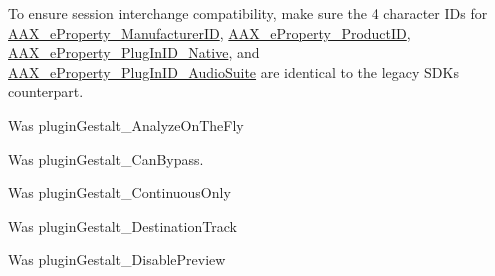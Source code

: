 \begin{DoxyRefList}
\label{a00880__porting_notes000040}%
%
 To ensure session interchange compatibility, make sure the 4 character IDs for \mbox{\hyperlink{a00737_a13e384f22825afd3db6d68395b79ce0da996465cca29a2a15291d1c788ac5728c}{AAX\+\_\+e\+Property\+\_\+\+Manufacturer\+ID}}, \mbox{\hyperlink{a00737_a13e384f22825afd3db6d68395b79ce0da3a41fcdff5af1a4fd19dcbca7b1ba6f3}{AAX\+\_\+e\+Property\+\_\+\+Product\+ID}}, \mbox{\hyperlink{a00737_a13e384f22825afd3db6d68395b79ce0da89ca3dd6e96895cda14976c1b1ceb826}{AAX\+\_\+e\+Property\+\_\+\+Plug\+In\+ID\+\_\+\+Native}}, and \mbox{\hyperlink{a00737_a13e384f22825afd3db6d68395b79ce0dad3344696b8298a8b254add3d039ea927}{AAX\+\_\+e\+Property\+\_\+\+Plug\+In\+ID\+\_\+\+Audio\+Suite}} are identical to the legacy SDK\textquotesingle{}s counterpart. 
\item[Member \mbox{\hyperlink{a00737_a13e384f22825afd3db6d68395b79ce0da9524773361ca8e712bef3547e8c46c9b}{AAX\+\_\+e\+Property\+\_\+\+Allow\+Preview\+Without\+Analysis}} ]\label{a00880__porting_notes000050}%
%
 Was plugin\+Gestalt\+\_\+\+Analyze\+On\+The\+Fly  
\item[Member \mbox{\hyperlink{a00737_a13e384f22825afd3db6d68395b79ce0da6819867a9e86913e59decf318416d755}{AAX\+\_\+e\+Property\+\_\+\+Can\+Bypass}} ]\label{a00880__porting_notes000046}%
%
 Was plugin\+Gestalt\+\_\+\+Can\+Bypass.  
\item[Member \mbox{\hyperlink{a00737_a13e384f22825afd3db6d68395b79ce0da95054276be8782d93437cd74669366d0}{AAX\+\_\+e\+Property\+\_\+\+Continuous\+Only}} ]\label{a00880__porting_notes000053}%
%
 Was plugin\+Gestalt\+\_\+\+Continuous\+Only  
\item[Member \mbox{\hyperlink{a00737_a13e384f22825afd3db6d68395b79ce0dadd8839e5678c8880215e318197cc8d3a}{AAX\+\_\+e\+Property\+\_\+\+Destination\+Track}} ]\label{a00880__porting_notes000051}%
%
 Was plugin\+Gestalt\+\_\+\+Destination\+Track  
\item[Member \mbox{\hyperlink{a00737_a13e384f22825afd3db6d68395b79ce0da854fdc19ab908b67aa3bc1f4262aa288}{AAX\+\_\+e\+Property\+\_\+\+Disable\+Preview}} ]\label{a00880__porting_notes000055}%
%
 Was plugin\+Gestalt\+\_\+\+Disable\+Preview  
\item[Member \mbox{\hyperlink{a00737_a13e384f22825afd3db6d68395b79ce0daaf6b47f0861af74ef5c5bb316481b97d}{AAX\+\_\+e\+Property\+\_\+\+Doesnt\+Incr\+Output\+Sample}} ]\label{a00880__porting_notes000056}%

\end{DoxyRefList}
